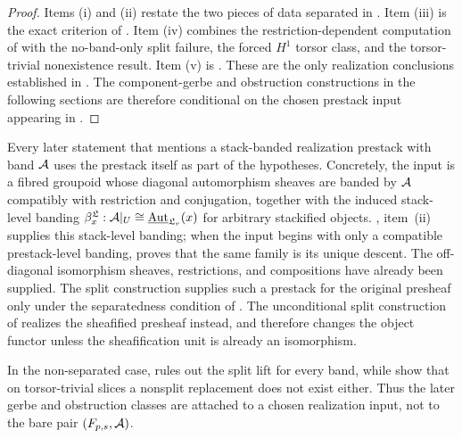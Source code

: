 \begin{proof}
Items \textup{(i)} and \textup{(ii)} restate the two pieces of data separated in
. Item
\textup{(iii)} is the exact criterion of
. Item \textup{(iv)} combines the
restriction-dependent computation of  with
the no-band-only split failure, the forced $H^1$ torsor class, and the
torsor-trivial nonexistence result. Item
\textup{(v)} is . These are the only realization
conclusions established in . The
component-gerbe and obstruction constructions in the following sections are
therefore conditional on the chosen prestack input appearing in
.
\end{proof}

\begin{remark}\label{rem:realization-hypothesis-ledger}
Every later statement that mentions a stack-banded realization prestack with band $\mathcal{A}$
uses the prestack itself as part of the hypotheses. Concretely, the input is a
fibred groupoid whose diagonal automorphism sheaves are banded by $\mathcal{A}$
compatibly with restriction and conjugation, together with the induced
stack-level banding
$\beta^{\mathfrak L}_x:\mathcal{A}|_U\cong
\underline{\mathrm{Aut}}_{\mathfrak L_r}(x)$ for arbitrary stackified objects.
, item~\textup{(ii)} supplies this stack-level banding;
when the input begins with only a compatible prestack-level banding,
 proves that the same family is its
unique descent. The off-diagonal isomorphism sheaves, restrictions, and
compositions have already been supplied. The split
construction supplies such a prestack for the original presheaf only under the
separatedness condition of
. The unconditional split construction of
 realizes the sheafified presheaf instead, and
therefore changes the object functor unless the sheafification unit is already
an isomorphism.

In the non-separated case,  rules out the
split lift for every band, while
show that on torsor-trivial slices a nonsplit replacement does not exist either.
Thus the later gerbe and obstruction classes are attached to a chosen
realization input, not to the bare pair $(F_{p,s},\mathcal{A})$.
\end{remark}

